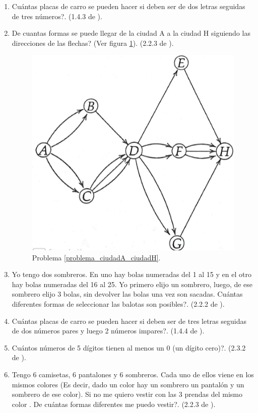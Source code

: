\begin{enumerate}
	\item Cuántas placas de carro se pueden hacer si deben ser de dos letras seguidas de tres números?. (1.4.3 de  \cite{ICP_Aops}). 
	
	\item \label{problema_ciudadA_ciudadH} De cuantas formas se puede llegar de la ciudad A a la ciudad H siguiendo las direcciones de las flechas? (Ver figura \ref{ciudadaciudadh}). (2.2.3 de  \cite{ICP_Aops}). 
	
	\begin{figure}
		\centering
		\includegraphics[width=0.5\linewidth]{Combinatoria/imgs/ciudadA_ciudadH}
		\caption{ Problema \ref{problema_ciudadA_ciudadH}. }
		\label{ciudadaciudadh}
	\end{figure}
	
	\item Yo tengo dos sombreros. En uno hay bolas numeradas del 1 al 15 y en el otro hay bolas numeradas del 16 al 25. Yo primero elijo un sombrero, luego, de ese sombrero elijo 3 bolas, sin devolver las bolas una vez son sacadas. Cuántas diferentes formas de seleccionar las balotas son posibles?. (2.2.2 de  \cite{ICP_Aops}). 
	
	\item Cuántas placas de carro se pueden hacer si deben ser de tres letras seguidas de dos números pares y luego 2 números impares?. (1.4.4 de \cite{ICP_Aops}).
	
	\item Cuántos números de 5 dígitos tienen al menos un 0 (un dígito cero)?. (2.3.2 de \cite{ICP_Aops}).
	
	\item Tengo 6 camisetas, 6 pantalones y 6 sombreros. Cada uno de ellos viene en los mismos colores (Es decir, dado un color hay un sombrero un pantalón y un sombrero de ese color). Si no me quiero vestir con las 3 prendas del mismo color . De cuántas formas diferentes me puedo vestir?. (2.2.3 de \cite{ICP_Aops}).
	

\end{enumerate}
